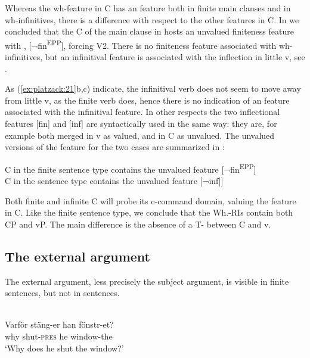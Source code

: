 \documentclass[output=paper]{LSP/langsci}
\begin{document}
Whereas the wh-feature in C has an  feature both in finite main clauses and in wh-infinitives, there is a difference with respect to the other features in C. In  we concluded that the C of the  main clause in  hosts an unvalued finiteness feature with , [¬fin\textsuperscript{EPP}], forcing V2. There is no finiteness feature associated with wh-infinitives, but an infinitival feature is associated with the  inflection in little v, see . 

As (\ref{ex:platzack:21}b,c) indicate, the infinitival verb does not seem to move away from little v, as the finite verb does, hence there is no indication of an  feature associated with the infinitival feature. In other respects the two inflectional features [fin] and [inf] are syntactically used in the same way: they are, for example both merged in v as valued, and in C as unvalued. The unvalued versions of the feature for the two cases are summarized in :

\ea%
\label{ex:platzack:22}
  \ea C in the finite sentence type contains the unvalued feature [¬fin\textsuperscript{EPP}]\\
  \ex C in the  sentence type contains the unvalued feature [¬inf]]\\
  \z
\z

Both finite and infinite C will probe its c-command domain, valuing the feature in C. Like the finite sentence type, we conclude that the Wh.-RIs contain both CP and vP. The main difference is the absence of a T- between C and v.

\subsection{The external argument}

The external argument, less precisely the subject argument, is visible in  finite sentences, but not in  sentences. 

 \ea\label{ex:platzack:23} 
   \\
   \ea
\gll Varför  stäng-er    han  fönstr-et?\\
        why    shut-\textsc{pres}  he    window-the\\
  \glt   ‘Why does he shut the window?’
\end{document}
